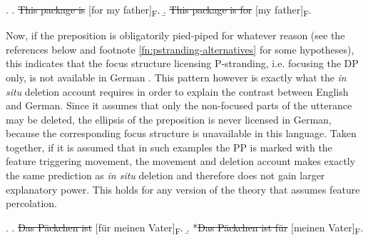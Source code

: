 \ex. \label{ex:pst-focus-english}
\a. \sout{This package is} [for my father]\textsubscript{\textsc{F}}.
\b. \sout{This package is for} [my father]\textsubscript{\textsc{F}}.

Now, if the preposition is obligatorily pied-piped for whatever reason (see the references below and footnote \ref{fn:pstranding-alternatives} for some hypotheses), this indicates that the focus structure licensing P-stranding, i.e. focusing the DP only, is not available in German \Next. This pattern however is exactly what the \textit{in situ} deletion account requires in order to explain the contrast between English and German. Since it assumes that only the non-focused parts of the utterance may be deleted, the ellipsis of the preposition is never licensed in German, because the corresponding focus structure \Next[b] is unavailable in this language. Taken together, if it is assumed that in such examples the PP is marked with the feature triggering movement, the movement and deletion account makes exactly the same prediction as \textit{in situ} deletion and therefore does not gain larger explanatory power. This holds for any version of the theory that assumes feature percolation.

\ex. \label{ex:pst-focus-german}
\a. \sout{Das Päckchen ist} [für meinen Vater]\textsubscript{F}. 
\b. *\sout{Das Päckchen ist für} [meinen Vater]\textsubscript{F}.

